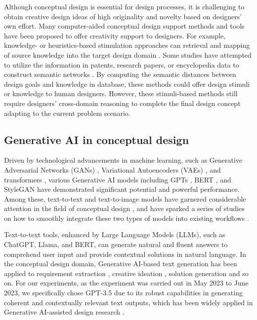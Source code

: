 \documentclass{dsj}
\begin{document}
Although conceptual design is essential for design processes, it is challenging to obtain creative design ideas of high originality and novelty based on designers' own effort. Many computer-aided conceptual design support methods and tools have been proposed to offer creativity support to designers. For example, knowledge- or heuristics-based stimulation approaches can retrieval and mapping of source knowledge into the target design domain \citep{jiang2022data}. Some studies have attempted to utilize the information in patents, research papers, or encyclopedia data to construct semantic networks \citep{luo2019computer, sarica2020technet}. By computing the semantic distances between design goals and knowledge in database, these methods could offer design stimuli or knowledge to human designers. However, these stimuli-based methods still require designers' cross-domain reasoning to complete the final design concept adapting to the current problem scenario.

\subsection{Generative AI in conceptual design}
Driven by technological advancements in machine learning, such as Generative Adversarial Networks (GANs) \citep{goodfellow2014generative}, Variational Autoencoders (VAEs) \citep{kingma2014auto}, and transformers \citep{vaswani2017attention}, various Generative AI models including GPTs \citep{radford2018improving}, BERT \citep{kenton2019bert}, and StyleGAN \citep{karras2019style} have demonstrated significant potential and powerful performance. Among these, text-to-text and text-to-image models have garnered considerable attention in the field of conceptual design \citep{wu2024integrating}, and have sparked a series of studies on how to smoothly integrate these two types of models into existing workflows \citep{mahdavi2024ai, guo2024exploring}. 

Text-to-text tools, enhanced by Large Language Models (LLMs), such as ChatGPT, Llama, and BERT, can generate natural and fluent answers to comprehend user input and provide contextual solutions in natural language. In the conceptual design domain, Generative AI-based text generation has been applied to requirement extraction \citep{shahin2024harnessing}, creative ideation \citep{suh2024luminate}, solution generation \citep{chen2024triz} and so on. For our experiments, as the experiment was carried out in May 2023 to June 2023, we specifically chose GPT-3.5 due to its robust capabilities in generating coherent and contextually relevant text outputs, which has been widely applied in Generative AI-assisted design research \citep{chen2024designfusion, chen2024llm, chen2024beyond}. 
\end{document}
